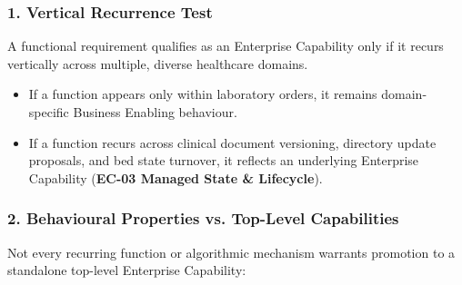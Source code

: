 \label{rad:enterprise:40}
\subsubsection*{1. Vertical Recurrence Test}
\label{rad:enterprise:41}

A functional requirement qualifies as an Enterprise Capability only if it recurs vertically across multiple, diverse healthcare domains.

\label{rad:enterprise:42}

\begin{itemize}

\item
If a function appears only within laboratory orders, it remains domain-specific Business Enabling behaviour.



\item
If a function recurs across clinical document versioning, directory update proposals, and bed state turnover, it reflects an underlying Enterprise Capability (\textbf{EC-03 Managed State \& Lifecycle}).



\end{itemize}
\label{rad:enterprise:45}
\subsubsection*{2. Behavioural Properties vs. Top-Level Capabilities}
\label{rad:enterprise:46}

Not every recurring function or algorithmic mechanism warrants promotion to a standalone top-level Enterprise Capability:

\label{rad:enterprise:47}

